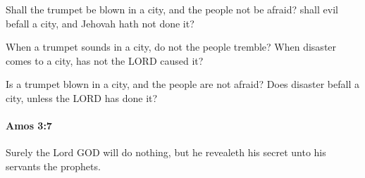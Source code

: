 			\begin{versebox}
					\item[BHS] 
					\item[LXX] 
					\item[ASV] Shall the trumpet be blown in a city, and the people not be afraid? shall evil befall a city, and Jehovah hath not done it?
					\item[NIV] When a trumpet sounds in a city, do not the people tremble? When disaster comes to a city, has not the LORD caused it?
					\item[NRSV] Is a trumpet blown in a city, and the people are not afraid? Does disaster befall a city, unless the LORD has done it?
			\end{versebox}

		\paragraph{Amos 3:7} %
			\label{AMOS-3-7}

			Surely the Lord GOD will do nothing, but he revealeth his secret unto his servants the prophets.

